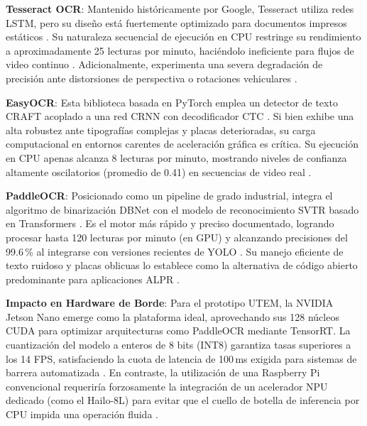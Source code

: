\textbf{Tesseract OCR}: 
Mantenido históricamente por Google, Tesseract utiliza redes LSTM, pero su diseño está 
fuertemente optimizado para documentos impresos estáticos 
\parencite{athilakshmiAutomaticNumberPlate2023, meesadAdvancedDeepLearning2025a, swatiEfficientDeepLearning2024}. 
Su naturaleza secuencial de ejecución en CPU restringe su rendimiento a aproximadamente 
25 lecturas por minuto, haciéndolo ineficiente para flujos de video continuo 
\parencite{xuDeepLearningAlgorithms2026c}. 
Adicionalmente, experimenta una severa degradación de precisión ante distorsiones de 
perspectiva o rotaciones vehiculares \parencite{swatiEfficientDeepLearning2024, xuDeepLearningAlgorithms2026c}.

\textbf{EasyOCR}: 
Esta biblioteca basada en PyTorch emplea un detector de texto CRAFT acoplado a una red 
CRNN con decodificador CTC \parencite{kuyunsaDeepLearningEnhancedAutomatic2025, mobeenRealTimeAutomaticLicense2026, xuDeepLearningAlgorithms2026c}. 
Si bien exhibe una alta robustez ante tipografías complejas y placas deterioradas, su 
carga computacional en entornos carentes de aceleración gráfica es crítica. Su ejecución en CPU 
apenas alcanza 8 lecturas por minuto, mostrando niveles de confianza altamente oscilatorios 
(promedio de 0.41) en secuencias de video real 
\parencite{mobeenRealTimeAutomaticLicense2026, xuDeepLearningAlgorithms2026c}.

\textbf{PaddleOCR}: 
Posicionado como un pipeline de grado industrial, integra el algoritmo de binarización 
DBNet con el modelo de reconocimiento SVTR basado en Transformers 
\parencite{buleuDeepLearningBasedSystem2025a, xuDeepLearningAlgorithms2026c}. 
Es el motor más rápido y preciso documentado, logrando procesar hasta 120 lecturas por 
minuto (en GPU) y alcanzando precisiones del 99.6\,\% al integrarse con versiones recientes 
de YOLO \parencite{buleuDeepLearningBasedSystem2025a, xuDeepLearningAlgorithms2026c}. 
Su manejo eficiente de texto ruidoso y placas oblicuas lo establece como la alternativa 
de código abierto predominante para aplicaciones ALPR \parencite{xuDeepLearningAlgorithms2026c}.

\textbf{Impacto en Hardware de Borde}: 
Para el prototipo UTEM, la NVIDIA Jetson Nano emerge como la plataforma ideal, aprovechando 
sus 128 núcleos CUDA para optimizar arquitecturas como PaddleOCR mediante TensorRT. 
La cuantización del modelo a enteros de 8 bits (INT8) garantiza tasas superiores a los 
14 FPS, satisfaciendo la cuota de latencia de 100\,ms exigida para sistemas de barrera 
automatizada \parencite{sonnaraEfficientRealtimeLicense2025, swatiEfficientDeepLearning2024, xuDeepLearningAlgorithms2026c}. 
En contraste, la utilización de una Raspberry Pi convencional requeriría forzosamente la 
integración de un acelerador NPU dedicado (como el Hailo-8L) para evitar que el cuello 
de botella de inferencia por CPU impida una operación fluida 
\parencite{sonnaraEfficientRealtimeLicense2025, xuDeepLearningAlgorithms2026c}.


